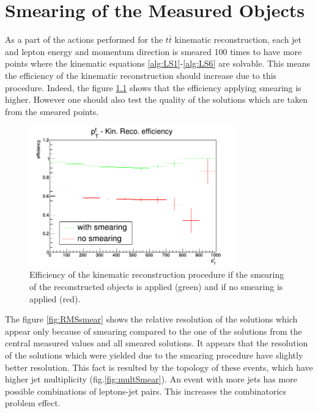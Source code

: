 \chapter{Smearing of the Measured Objects}\label{appendix:smear}

As a part of the actions performed for the $t\bar{t}$ kinematic reconstruction, each jet and lepton energy 
and momentum direction is smeared 100 times to have more points where the kinematic equations \ref{alg:LS1}-\ref{alg:LS6} 
are solvable. This means the efficiency of the kinematic reconstruction should increase due to this procedure.
Indeed, the figure \ref{fig:SmearEff} shows that the efficiency applying smearing is higher. However one should also test the
quality of the solutions which are taken from the smeared points.

\begin{figure}[h]
  \centering
  \includegraphics[width=0.8\textwidth]{10_appendices/smearing/Smereff.png}
  \caption{Efficiency of the kinematic reconstruction procedure if the smearing of the reconstructed objects is applied (green)
  and if no smearing is applied (red).}
  \label{fig:SmearEff}
\end{figure}

The figure \ref{fig:RMSsmear} shows the relative resolution of the solutions which appear only because of smearing compared to the one of the
solutions from the central measured values and all smeared solutions. It appears that the resolution of the solutions
which were yielded due to the smearing procedure have slightly better resolution. This fact is resulted by the topology of these 
events, which have higher jet multiplicity (fig.\ref{fig:multSmear}). An event with more jets has more possible combinations of leptons-jet pairs. This
increases the combinatorics problem effect. 

